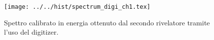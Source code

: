 \begin{figure}[h] \centering\texttt{[image: ../../hist/spectrum\_digi\_ch1.tex]}\caption{Spettro calibrato in energia ottenuto dal secondo rivelatore tramite l'uso del digitizer.}\label{hist:spectrum_digi_ch1} \end{figure}
